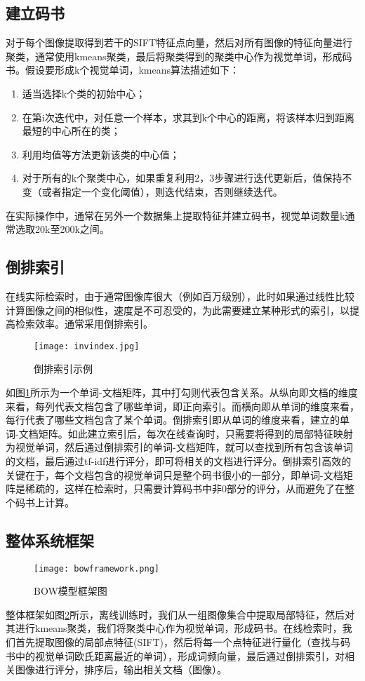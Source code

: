 \subsection{建立码书}
对于每个图像提取得到若干的SIFT特征点向量，然后对所有图像的特征向量进行聚类，通常使用kmeans聚类，最后将聚类得到的聚类中心作为视觉单词，形成码书。假设要形成k个视觉单词，kmeans算法描述如下：
\begin{enumerate}
\item 适当选择k个类的初始中心；
\item 在第i次迭代中，对任意一个样本，求其到k个中心的距离，将该样本归到距离最短的中心所在的类；
\item 利用均值等方法更新该类的中心值；
\item 对于所有的k个聚类中心，如果重复利用2，3步骤进行迭代更新后，值保持不变（或者指定一个变化阈值），则迭代结束，否则继续迭代。
\end{enumerate}
在实际操作中，通常在另外一个数据集上提取特征并建立码书，视觉单词数量k通常选取20k至200k之间。

\subsection{倒排索引}
在线实际检索时，由于通常图像库很大（例如百万级别），此时如果通过线性比较计算图像之间的相似性，速度是不可忍受的，为此需要建立某种形式的索引，以提高检索效率。通常采用倒排索引。
\begin{figure}[h]
\centering
\texttt{[image: invindex.jpg]}
\caption{倒排索引示例}\label{fig:invindex}
\end{figure}
如图\ref{fig:invindex}所示为一个单词-文档矩阵，其中打勾则代表包含关系。从纵向即文档的维度来看，每列代表文档包含了哪些单词，即正向索引。而横向即从单词的维度来看，每行代表了哪些文档包含了某个单词。倒排索引即从单词的维度来看，建立的单词-文档矩阵。如此建立索引后，每次在线查询时，只需要将得到的局部特征映射为视觉单词，然后通过倒排索引的单词-文档矩阵，就可以查找到所有包含该单词的文档，最后通过tf-idf进行评分，即可将相关的文档进行评分。倒排索引高效的关键在于，每个文档包含的视觉单词只是整个码书很小的一部分，即单词-文档矩阵是稀疏的，这样在检索时，只需要计算码书中非0部分的评分，从而避免了在整个码书上计算。

\subsection{整体系统框架}
\begin{figure}[h]
\centering
\texttt{[image: bowframework.png]}
\caption{BOW模型框架图}\label{fig:bowframework}
\end{figure}
整体框架如图\ref{fig:bowframework}所示，离线训练时，我们从一组图像集合中提取局部特征，然后对其进行kmeans聚类，我们将聚类中心作为视觉单词，形成码书。在线检索时，我们首先提取图像的局部点特征(SIFT)，然后将每一个点特征进行量化（查找与码书中的视觉单词欧氏距离最近的单词），形成词频向量，最后通过倒排索引，对相关图像进行评分，排序后，输出相关文档（图像）。

